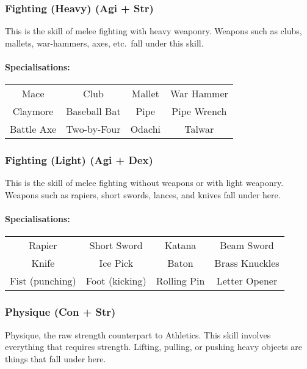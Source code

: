 \subsubsection{Fighting (Heavy) (Agi + Str)}
This is the skill of melee fighting with heavy weaponry. Weapons such as clubs, mallets, war-hammers, axes, etc.\ fall under this skill.

\paragraph{Specialisations:}
\begin{center}
    \begin{tabular}{c|c|c|c}
        Mace & Club & Mallet & War Hammer \\
        Claymore & Baseball Bat & Pipe & Pipe Wrench \\
        Battle Axe & Two-by-Four & Odachi & Talwar \\
    \end{tabular}
\end{center}

\subsubsection{Fighting (Light) (Agi + Dex)}
This is the skill of melee fighting without weapons or with light weaponry. 
Weapons such as rapiers, short swords, lances, and knives fall under here.

\paragraph{Specialisations:}
\begin{center}
    \begin{tabular}{c|c|c|c}
        Rapier & Short Sword & Katana & Beam Sword \\
        Knife & Ice Pick & Baton & Brass Knuckles \\
        Fist (punching) & Foot (kicking) & Rolling Pin & Letter Opener \\
    \end{tabular}
\end{center}

\subsubsection{Physique (Con + Str)}
Physique, the raw strength counterpart to Athletics. 
This skill involves everything that requires strength.
Lifting, pulling, or pushing heavy objects are things that fall under here.


